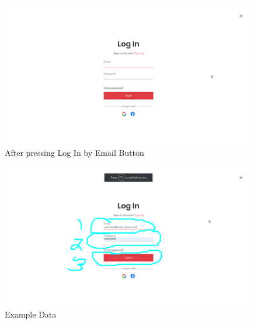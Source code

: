 \documentclass{article}
\begin{document}
\begin{figure}[H]
\centering
\includegraphics[scale=0.8]{img/c.png}
\caption{After pressing Log In by Email Button}
\end{figure}
\begin{figure}[H]
\centering
\includegraphics[scale=0.8]{img/d.png}
\caption{Example Data}
\end{figure}
\end{document}
